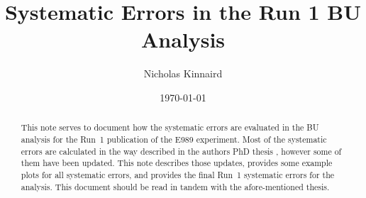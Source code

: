 \documentclass[12pt,letterpaper]{article}
\title{Systematic Errors in the Run 1 BU \wa Analysis}
\author{Nicholas Kinnaird}
\date{\today}
\begin{document}
\maketitle

\begin{abstract}
	This note serves to document how the systematic errors are evaluated in the BU analysis for the Run~1 publication of the E989 experiment. Most of the systematic errors are calculated in the way described in the authors PhD thesis \cite{phdthesis:2020Kinnaird}, however some of them have been updated. This note describes those updates, provides some example plots for all systematic errors, and provides the final Run~1 systematic errors for the analysis. This document should be read in tandem with the afore-mentioned thesis.
\end{abstract}

\tableofcontents

















{}
\printbibliography

\end{document}
